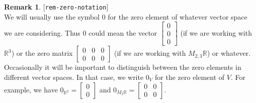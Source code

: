 \documentclass{amsart}
\newcommand{\lbl}[1]{\label{#1}\textup{[\texttt{#1}]}\ \\}
\newcommand{\lbl}{\label}
\newcommand{\R}         {{\mathbb{R}}}
\newcommand{\bsm}       {\left[\begin{smallmatrix}}
\newcommand{\esm}       {\end{smallmatrix}\right]}
\renewcommand{\:}       {\colon}
\theoremstyle{definition}
\newtheorem{remark}[theorem]{Remark}
\begin{document}
\begin{remark}\lbl{rem-zero-notation}
 We will usually use the symbol $0$ for the zero element of
 whatever vector space we are considering.  Thus $0$ could
 mean the vector $\bsm 0\\0\\0\esm$ (if we are working with
 $\R^3$) or the zero matrix $\bsm 0&0&0\\0&0&0\esm$ (if we
 are working with $M_{2,3}\R$) or whatever.  Occasionally it
 will be important to distinguish between the zero elements
 in different vector spaces.  In that case, we write $0_V$
 for the zero element of $V$.  For example, we have
 $0_{\R^2}=\bsm 0\\0\esm$ and $0_{M_2\R}=\bsm 0&0\\0&0\esm$.
\end{remark}
\end{document}
